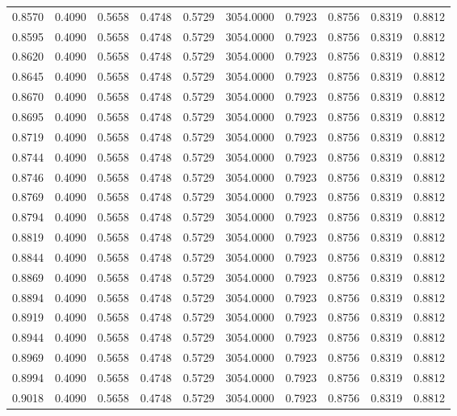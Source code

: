 \begin{tabular}{rrrrrrrrrr}
0.8570 & 0.4090 & 0.5658 & 0.4748 & 0.5729 & 3054.0000 & 0.7923 & 0.8756 & 0.8319 & 0.8812 \\
0.8595 & 0.4090 & 0.5658 & 0.4748 & 0.5729 & 3054.0000 & 0.7923 & 0.8756 & 0.8319 & 0.8812 \\
0.8620 & 0.4090 & 0.5658 & 0.4748 & 0.5729 & 3054.0000 & 0.7923 & 0.8756 & 0.8319 & 0.8812 \\
0.8645 & 0.4090 & 0.5658 & 0.4748 & 0.5729 & 3054.0000 & 0.7923 & 0.8756 & 0.8319 & 0.8812 \\
0.8670 & 0.4090 & 0.5658 & 0.4748 & 0.5729 & 3054.0000 & 0.7923 & 0.8756 & 0.8319 & 0.8812 \\
0.8695 & 0.4090 & 0.5658 & 0.4748 & 0.5729 & 3054.0000 & 0.7923 & 0.8756 & 0.8319 & 0.8812 \\
0.8719 & 0.4090 & 0.5658 & 0.4748 & 0.5729 & 3054.0000 & 0.7923 & 0.8756 & 0.8319 & 0.8812 \\
0.8744 & 0.4090 & 0.5658 & 0.4748 & 0.5729 & 3054.0000 & 0.7923 & 0.8756 & 0.8319 & 0.8812 \\
0.8746 & 0.4090 & 0.5658 & 0.4748 & 0.5729 & 3054.0000 & 0.7923 & 0.8756 & 0.8319 & 0.8812 \\
0.8769 & 0.4090 & 0.5658 & 0.4748 & 0.5729 & 3054.0000 & 0.7923 & 0.8756 & 0.8319 & 0.8812 \\
0.8794 & 0.4090 & 0.5658 & 0.4748 & 0.5729 & 3054.0000 & 0.7923 & 0.8756 & 0.8319 & 0.8812 \\
0.8819 & 0.4090 & 0.5658 & 0.4748 & 0.5729 & 3054.0000 & 0.7923 & 0.8756 & 0.8319 & 0.8812 \\
0.8844 & 0.4090 & 0.5658 & 0.4748 & 0.5729 & 3054.0000 & 0.7923 & 0.8756 & 0.8319 & 0.8812 \\
0.8869 & 0.4090 & 0.5658 & 0.4748 & 0.5729 & 3054.0000 & 0.7923 & 0.8756 & 0.8319 & 0.8812 \\
0.8894 & 0.4090 & 0.5658 & 0.4748 & 0.5729 & 3054.0000 & 0.7923 & 0.8756 & 0.8319 & 0.8812 \\
0.8919 & 0.4090 & 0.5658 & 0.4748 & 0.5729 & 3054.0000 & 0.7923 & 0.8756 & 0.8319 & 0.8812 \\
0.8944 & 0.4090 & 0.5658 & 0.4748 & 0.5729 & 3054.0000 & 0.7923 & 0.8756 & 0.8319 & 0.8812 \\
0.8969 & 0.4090 & 0.5658 & 0.4748 & 0.5729 & 3054.0000 & 0.7923 & 0.8756 & 0.8319 & 0.8812 \\
0.8994 & 0.4090 & 0.5658 & 0.4748 & 0.5729 & 3054.0000 & 0.7923 & 0.8756 & 0.8319 & 0.8812 \\
0.9018 & 0.4090 & 0.5658 & 0.4748 & 0.5729 & 3054.0000 & 0.7923 & 0.8756 & 0.8319 & 0.8812 \\

\end{tabular}
